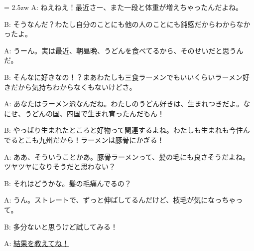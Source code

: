 \documentclass[11pt]{amsart}
\title{}
\author{}
\newenvironment{hangall}[1]{\hangindent = 2.5zw\everypar{\hangindent = 2.5zw}}{}
\begin{document}
\maketitle
\begin{hangall}{}%
A: ねえねえ！最近さー、また一段と体重が増えちゃったんだよね。

B: そうなんだ？わたし自分のことにも他の人のことにも鈍感だからわからなかったよ。

A: うーん。実は最近、朝昼晩、うどんを食べてるから、そのせいだと思うんだ。

B: そんなに好きなの！？まあわたしも三食ラーメンでもいいくらいラーメン好きだから気持ちわからなくもないけどさ。

A: あなたはラーメン派なんだね。わたしのうどん好きは、生まれつきだよ。なにせ、うどんの国、四国で生まれ育ったんだもん！

B: やっぱり生まれたところと好物って関連するよね。わたしも生まれも今住んでるとこも九州だから！ラーメンは豚骨にかぎる！

A: ああ、そういうことかあ。豚骨ラーメンって、髪の毛にも良さそうだよね。ツヤツヤになりそうだと思わない？

B: それはどうかな。髪の毛痛んでるの？

A: うん。ストレートで、ずっと伸ばしてるんだけど、枝毛が気になっちゃって。

B: 多分ないと思うけど試してみる！

A: \ul{結果を教えてね！}\end{hangall}
\end{document}
